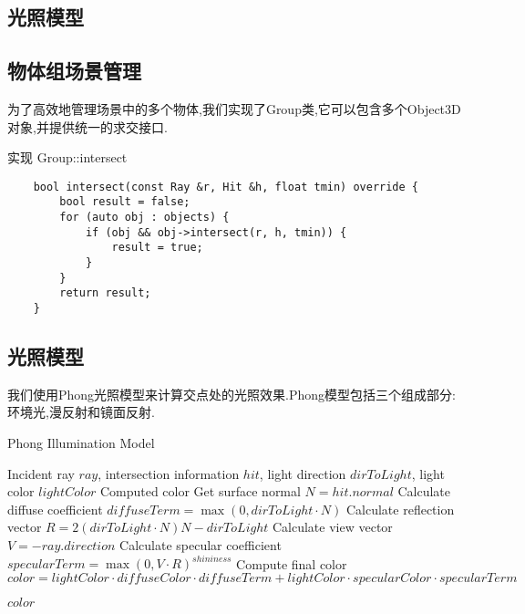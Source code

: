\documentclass[a4paper,twoside]{article}
\begin{document}
\subsection{光照模型}
\subsection{物体组场景管理}
为了高效地管理场景中的多个物体,我们实现了Group类,它可以包含多个Object3D对象,并提供统一的求交接口.
\begin{listing}[H]
    \caption{实现 Group::intersect}
    \label{code:group_intersect}
    \begin{verbatim}
    bool intersect(const Ray &r, Hit &h, float tmin) override {
        bool result = false;
        for (auto obj : objects) {
            if (obj && obj->intersect(r, h, tmin)) {
                result = true;
            }
        }
        return result;
    }
    \end{verbatim}
\end{listing}

\subsection{光照模型}
我们使用Phong光照模型来计算交点处的光照效果.Phong模型包括三个组成部分:环境光,漫反射和镜面反射.
\begin{algorithm}[H]
    \caption{Phong Illumination Model}
    \label{alg:phong}
    \begin{algorithmic}[1]
        \REQUIRE Incident ray $ray$, intersection information $hit$, light direction $dirToLight$, light color $lightColor$
        \ENSURE Computed color
        \STATE Get surface normal $N = hit.normal$
        \STATE Calculate diffuse coefficient $diffuseTerm = \max(0, dirToLight \cdot N)$
        \STATE Calculate reflection vector $R = 2(dirToLight \cdot N)N - dirToLight$
        \STATE Calculate view vector $V = -ray.direction$
        \STATE Calculate specular coefficient $specularTerm = \max(0, V \cdot R)^{shininess}$
        \STATE Compute final color $color = lightColor \cdot diffuseColor \cdot diffuseTerm + lightColor \cdot specularColor \cdot specularTerm$
        
        \RETURN $color$
    \end{algorithmic}
\end{algorithm}
\end{document}
